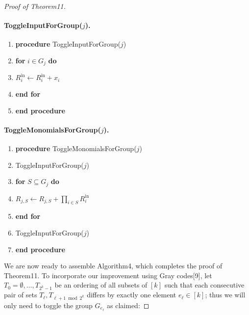 \documentclass[10pt,a4paper]{article}
\begin{document}
\begin{proof}[Proof of Theorem11]
\paragraph{ToggleInputForGroup($j$).}
\begin{enumerate}[label=\arabic*:]
\item \textbf{procedure} ToggleInputForGroup($j$)
\item \textbf{for} $i\in G_j$ \textbf{do}
\item $R_i^{\mathrm{in}}\leftarrow R_i^{\mathrm{in}}+x_i$
\item \textbf{end for}
\item \textbf{end procedure}
\end{enumerate}
\paragraph{ToggleMonomialsForGroup($j$).}
\begin{enumerate}[label=\arabic*:]
\item \textbf{procedure} ToggleMonomialsForGroup($j$)
\item ToggleInputForGroup($j$)
\item \textbf{for} $S\subseteq G_j$ \textbf{do}
\item $R_{j,S}\leftarrow R_{j,S}+\prod_{i\in S}R_i^{\mathrm{in}}$
\item \textbf{end for}
\item ToggleInputForGroup($j$)
\item \textbf{end procedure}
\end{enumerate}
We are now ready to assemble Algorithm4, which completes the proof of Theorem11. To incorporate our improvement using Gray codes[9], let $T_0=\emptyset,\ldots,T_{2^k-1}$ be an ordering of all subsets of $[k]$ such that each consecutive pair of sets $T_{\ell},T_{\ell+1\bmod2^k}$ differs by exactly one element $e_{\ell}\in[k]$; thus we will only need to toggle the group $G_{e_{\ell}}$ as claimed:

\end{proof}
\end{document}
